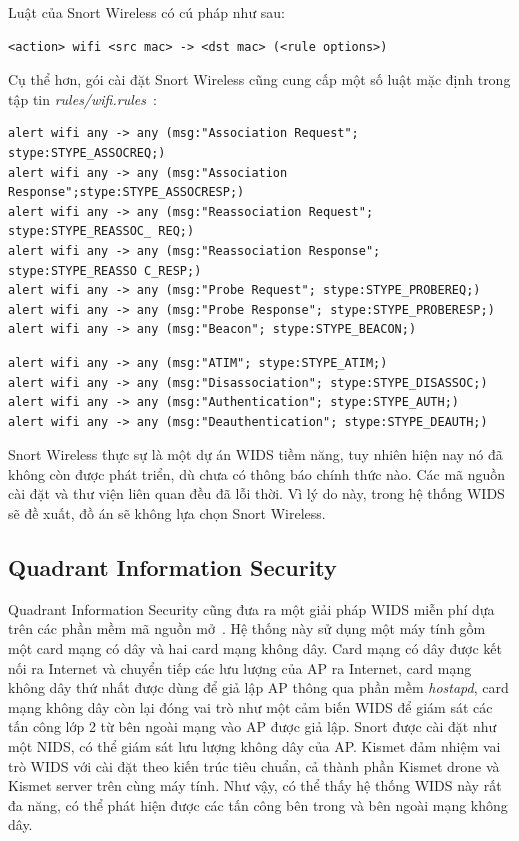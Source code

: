 Luật của Snort Wireless có cú pháp như sau:

\begin{lstlisting}
<action> wifi <src mac> -> <dst mac> (<rule options>)
\end{lstlisting}

Cụ thể hơn, gói cài đặt Snort Wireless cũng cung cấp một số luật mặc định trong tập tin \emph{rules/wifi.rules}~\cite{caswell2005nessus}:\\

\begin{lstlisting}
alert wifi any -> any (msg:"Association Request"; stype:STYPE_ASSOCREQ;)
alert wifi any -> any (msg:"Association Response";stype:STYPE_ASSOCRESP;)
alert wifi any -> any (msg:"Reassociation Request"; stype:STYPE_REASSOC_ REQ;)
alert wifi any -> any (msg:"Reassociation Response"; stype:STYPE_REASSO C_RESP;)
alert wifi any -> any (msg:"Probe Request"; stype:STYPE_PROBEREQ;)
alert wifi any -> any (msg:"Probe Response"; stype:STYPE_PROBERESP;)
alert wifi any -> any (msg:"Beacon"; stype:STYPE_BEACON;)
\end{lstlisting}

\restoregeometry
{}
\headsep=0pt

\begin{lstlisting}
alert wifi any -> any (msg:"ATIM"; stype:STYPE_ATIM;)
alert wifi any -> any (msg:"Disassociation"; stype:STYPE_DISASSOC;)
alert wifi any -> any (msg:"Authentication"; stype:STYPE_AUTH;)
alert wifi any -> any (msg:"Deauthentication"; stype:STYPE_DEAUTH;)
\end{lstlisting}

Snort Wireless thực sự là một dự án WIDS tiềm năng, tuy nhiên hiện nay nó đã không còn được phát triển, dù chưa có thông báo chính thức nào. Các mã nguồn cài đặt và thư viện liên quan đều đã lỗi thời. Vì lý do này, trong hệ thống WIDS sẽ đề xuất, đồ án sẽ không lựa chọn Snort Wireless.

\subsection{Quadrant Information Security}
Quadrant Information Security cũng đưa ra một giải pháp WIDS miễn phí dựa trên các phần mềm mã nguồn mở~\cite{champ2014building}. Hệ thống này sử dụng một máy tính gồm một card mạng có dây và hai card mạng không dây. Card mạng có dây được kết nối ra Internet và chuyển tiếp các lưu lượng của AP ra Internet, card mạng không dây thứ nhất được dùng để giả lập AP thông qua phần mềm \emph{hostapd}, card mạng không dây còn lại đóng vai trò như một cảm biến WIDS để giám sát các tấn công lớp 2 từ bên ngoài mạng vào AP được giả lập. Snort được cài đặt như một NIDS, có thể giám sát lưu lượng không dây của AP. Kismet đảm nhiệm vai trò WIDS với cài đặt theo kiến trúc tiêu chuẩn, cả thành phần Kismet drone và Kismet server trên cùng máy tính. Như vậy, có thể thấy hệ thống WIDS này rất đa năng, có thể phát hiện được các tấn công bên trong và bên ngoài mạng không dây.

